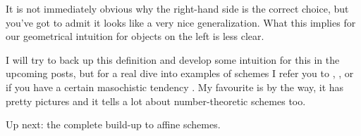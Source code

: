 It is not immediately obvious why the right-hand side is the correct choice, but you've got to admit it looks like a very nice generalization. What this implies for our geometrical intuition for objects on the left is less clear.

I will try to back up this definition and develop some intuition for this in the upcoming posts, but for a real dive into examples of schemes I refer you to \cite{geometry-of-schemes}, \cite{foag}, \cite{red-book} or if you have a certain masochistic tendency \cite{hartshorne}. My favourite is \cite{foag} by the way, it has pretty pictures and it tells a lot about number-theoretic schemes too.

Up next: the complete build-up to affine schemes.
